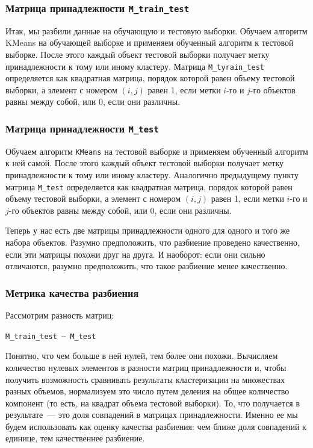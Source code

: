 \documentclass[a4paper,12pt]{article}
\begin{document}
\subsubsection{Матрица принадлежности \texttt{M\_train\_test}} 

Итак, мы разбили данные на обучающую и тестовую выборки. Обучаем алгоритм KMeans на обучающей выборке и применяем обученный алгоритм к тестовой выборке. После этого каждый объект тестовой выборки получает метку принадлежности к тому или иному кластеру. Матрица \texttt{M\_tyrain\_test} определяется как квадратная матрица, порядок которой равен объему тестовой выборки, а элемент с номером $(i, j)$ равен 1, если метки $i$-го и $j$-го объектов равны между собой, или 0, если они различны.


\subsubsection{Матрица принадлежности \texttt{M\_test}} 

Обучаем алгоритм \texttt{KMeans} на тестовой выборке и применяем обученный алгоритм к ней самой. После этого каждый объект тестовой выборки получает метку принадлежности к тому или иному кластеру. Аналогично предыдущему пункту матрица \texttt{M\_test} определяется как квадратная матрица, порядок которой равен объему тестовой выборки, а элемент с номером $(i, j)$ равен 1, если метки $i$-го и $j$-го объектов равны между собой, или 0, если они различны.

Теперь у нас есть две матрицы принадлежности одного для одного и того же набора объектов. Разумно предположить, что разбиение проведено качественно, если эти матрицы похожи друг на друга. И наоборот: если они сильно отличаются, разумно предположить, что такое разбиение менее качественно.

\subsubsection{Метрика качества разбиения} 

Рассмотрим разность матриц:

\medskip\noindent
\texttt{M\_train\_test – M\_test}

\medskip\noindent
Понятно, что чем больше в ней нулей, тем более они похожи. Вычисляем количество нулевых элементов в разности матриц принадлежности и, чтобы получить возможность сравнивать результаты кластеризации на множествах разных объемов, нормализуем это число путем деления на общее количество компонент (то есть, на квадрат объема тестовой выборки). То, что получается в результате — это доля совпадений в матрицах принадлежности. Именно ее мы будем использовать как оценку качества разбиения: чем ближе доля совпадений к единице, тем качественнее разбиение.
\end{document}
